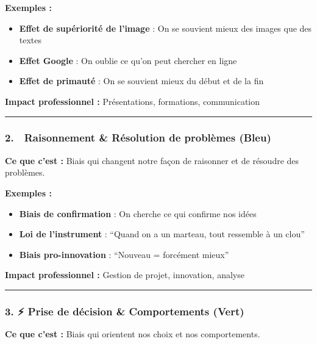 \documentclass[
]{article}
\providecommand{\tightlist}{%
  \setlength{\itemsep}{0pt}\setlength{\parskip}{0pt}}
\begin{document}
\textbf{Exemples :}

\begin{itemize}
\tightlist
\item
  \textbf{Effet de supériorité de l'image} : On se souvient mieux des
  images que des textes
\item
  \textbf{Effet Google} : On oublie ce qu'on peut chercher en ligne
\item
  \textbf{Effet de primauté} : On se souvient mieux du début et de la
  fin
\end{itemize}

\textbf{Impact professionnel :} Présentations, formations, communication

\begin{center}\rule{0.5\linewidth}{0.5pt}\end{center}

\subsubsection{2. 🤔 Raisonnement \& Résolution de problèmes
(Bleu)}\label{raisonnement-ruxe9solution-de-probluxe8mes-bleu}

\textbf{Ce que c'est :} Biais qui changent notre façon de raisonner et
de résoudre des problèmes.

\textbf{Exemples :}

\begin{itemize}
\tightlist
\item
  \textbf{Biais de confirmation} : On cherche ce qui confirme nos idées
\item
  \textbf{Loi de l'instrument} : ``Quand on a un marteau, tout ressemble
  à un clou''
\item
  \textbf{Biais pro-innovation} : ``Nouveau = forcément mieux''
\end{itemize}

\textbf{Impact professionnel :} Gestion de projet, innovation, analyse

\begin{center}\rule{0.5\linewidth}{0.5pt}\end{center}

\subsubsection{3. ⚡ Prise de décision \& Comportements
(Vert)}\label{prise-de-duxe9cision-comportements-vert}

\textbf{Ce que c'est :} Biais qui orientent nos choix et nos
comportements.
\end{document}
